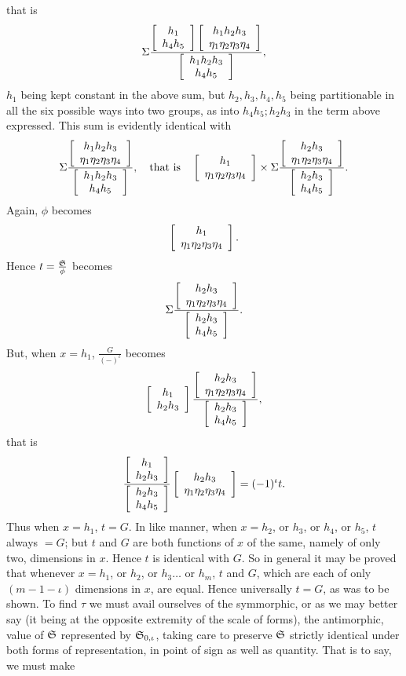 \documentclass[11pt]{article}
\newcommand{\sourcepage}[1]{\marginpar{\scriptsize p.~#1}}
\begin{document}
\sourcepage{477}
that is
\[
\Sigma
\frac{\left[\begin{array}{c}h_1\\h_4h_5\end{array}\right]\left[\begin{array}{c}h_1h_2h_3\\\eta_1\eta_2\eta_3\eta_4\end{array}\right]}
{\left[\begin{array}{c}h_1h_2h_3\\h_4h_5\end{array}\right]},
\]
$h_1$ being kept constant in the above sum, but $h_2,h_3,h_4,h_5$ being partitionable in all the six possible ways into two groups, as into $h_4h_5;h_2h_3$ in the term above expressed. This sum is evidently identical with
\[
\Sigma\frac{\left[\begin{array}{c}h_1h_2h_3\\\eta_1\eta_2\eta_3\eta_4\end{array}\right]}{\left[\begin{array}{c}h_1h_2h_3\\h_4h_5\end{array}\right]},
\quad\hbox{that is}\quad
\left[\begin{array}{c}h_1\\\eta_1\eta_2\eta_3\eta_4\end{array}\right]\times
\Sigma\frac{\left[\begin{array}{c}h_2h_3\\\eta_1\eta_2\eta_3\eta_4\end{array}\right]}{\left[\begin{array}{c}h_2h_3\\h_4h_5\end{array}\right]}.
\]
Again, $\phi$ becomes
\[
\left[\begin{array}{c}h_1\\\eta_1\eta_2\eta_3\eta_4\end{array}\right].
\]
Hence $t=\frac{\mathfrak{S}}{\phi}$ becomes
\[
\Sigma\frac{\left[\begin{array}{c}h_2h_3\\\eta_1\eta_2\eta_3\eta_4\end{array}\right]}{\left[\begin{array}{c}h_2h_3\\h_4h_5\end{array}\right]}.
\]
But, when $x=h_1$, $\frac{G}{(-)^\iota}$ becomes
\[
\left[\begin{array}{c}h_1\\h_2h_3\end{array}\right]
\frac{\left[\begin{array}{c}h_2h_3\\\eta_1\eta_2\eta_3\eta_4\end{array}\right]}{\left[\begin{array}{c}h_2h_3\\h_4h_5\end{array}\right]},
\]
that is
\[
\frac{\left[\begin{array}{c}h_1\\h_2h_3\end{array}\right]}{\left[\begin{array}{c}h_2h_3\\h_4h_5\end{array}\right]}
\left[\begin{array}{c}h_2h_3\\\eta_1\eta_2\eta_3\eta_4\end{array}\right]=(-1)^\iota t.
\]
Thus when $x=h_1$, $t=G$. In like manner, when $x=h_2$, or $h_3$, or $h_4$, or $h_5$, $t$ always $=G$; but $t$ and $G$ are both functions of $x$ of the same, namely of only two, dimensions in $x$. Hence $t$ is identical with $G$. So in general it may be proved that whenever $x=h_1$, or $h_2$, or $h_3\ldots$ or $h_m$, $t$ and $G$, which are each of only $(m-1-\iota)$ dimensions in $x$, are equal. Hence universally $t=G$, as was to be shown. To find $\tau$ we must avail ourselves of the symmorphic, or as we may better say (it being at the opposite extremity of the scale of forms), the antimorphic, value of $\mathfrak{S}$ represented by $\mathfrak{S}_{0,\iota}$, taking care to preserve $\mathfrak{S}$ strictly identical under both forms of representation, in point of sign as well as quantity. That is to say, we must make
\end{document}
